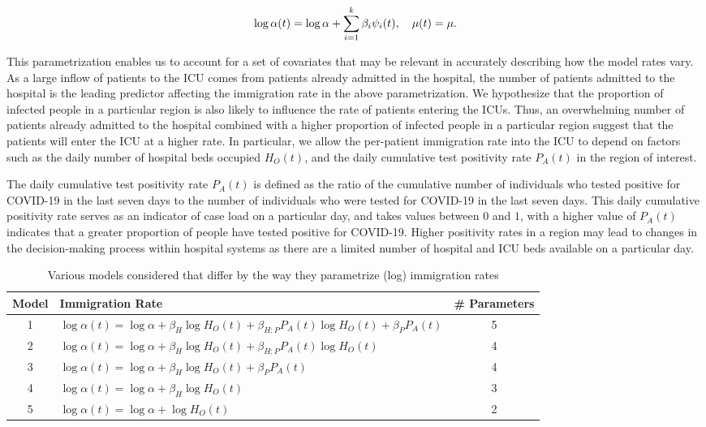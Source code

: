 \documentclass{article}
\newcommand{\achal}[1]{{\color{black}{ #1}}}
\begin{document}
\begin{equation}
   \log \alpha(t) = \log\alpha + \sum_{i=1}^{k}\beta_{i} \achal{\psi_{i}(t)} , \quad \mu(t) = \mu.
   \label{eq:rates_covariates}
\end{equation}

This parametrization enables us to account for a set of covariates that may be relevant in accurately describing how the model rates vary. As a large inflow of patients to the ICU comes from patients already admitted in the hospital, the number of patients admitted to the hospital is the leading predictor affecting the immigration rate in the above parametrization. We hypothesize that the proportion of infected people in a particular region is also likely to influence the rate of patients entering the ICUs. Thus, an overwhelming number of patients already admitted to the hospital combined with a higher proportion of infected people in a particular region suggest that the patients will enter the ICU at a higher rate. In particular, we allow the per-patient immigration rate into the ICU to depend on factors such as the daily number of hospital beds occupied $H_{O}(t)$, and the daily cumulative test positivity rate $P_A(t)$ in the region of interest. \par

The daily cumulative test positivity rate $P_A(t)$ is defined as the ratio of the cumulative number of individuals who tested positive for COVID-19 in the last seven days to the number of individuals who were tested for COVID-19 in the last seven days. This daily cumulative positivity rate serves as an indicator of case load on a particular day, and takes values between $0$ and $1$, with a higher value of $P_{A}(t)$ indicates that a greater proportion of people have tested positive for COVID-19. Higher positivity rates in a region may lead to changes in the decision-making process within hospital systems as there are a limited number of hospital and ICU beds available on a particular day. 

\begin{table}[h]
\centering
\begin{tabular}{c l c}
\textbf{Model} & \textbf{Immigration Rate}  & \# \textbf{Parameters} \\ \hline
 1 & $\log{\alpha(t)} = \log{\alpha} + \beta_{H} \log{H_{O}(t)} + \beta_{H:P}P_{A}(t)\log{H_{O}(t)} + \beta_{P}P_{A}(t)$  & 5\\ 
 2 & $\log{\alpha(t)} = \log{\alpha} + \beta_{H} \log{H_{O}(t)} + \beta_{H:P}P_{A}(t)\log{H_{O}(t)}$  & 4 \\ 
 3 & $\log{\alpha(t)} = \log{\alpha} + \beta_{H} \log{H_{O}(t)} + \beta_{P}P_{A}(t)$  & 4 \\ 
 4 & $\log{\alpha(t)} = \log{\alpha} + \beta_{H} \log{H_{O}(t)}$  & 3 \\
 5 & $\log{\alpha(t)} = \log{\alpha} + \log{H_{O}(t)}$  & 2 \\ \hline
\end{tabular}
\vspace{2mm}
\caption{Various models considered that differ by the way they parametrize (log) immigration rates}
\label{tab1}
\end{table}
\end{document}
